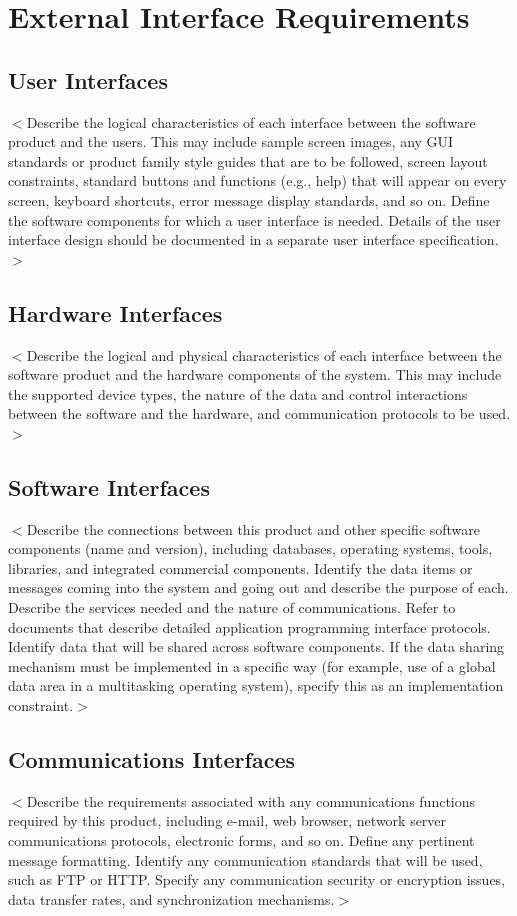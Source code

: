 \documentclass{scrreprt}
\begin{document}
\chapter{External Interface Requirements}

\section{User Interfaces}
$<$Describe the logical characteristics of each interface between the software
product and the users. This may include sample screen images, any GUI standards
or product family style guides that are to be followed, screen layout
constraints, standard buttons and functions (e.g., help) that will appear on
every screen, keyboard shortcuts, error message display standards, and so on.
Define the software components for which a user interface is needed. Details of
the user interface design should be documented in a separate user interface
specification.$>$

\section{Hardware Interfaces}
$<$Describe the logical and physical characteristics of each interface between
the software product and the hardware components of the system. This may include
the supported device types, the nature of the data and control interactions
between the software and the hardware, and communication protocols to be
used.$>$

\section{Software Interfaces}
$<$Describe the connections between this product and other specific software
components (name and version), including databases, operating systems, tools,
libraries, and integrated commercial components. Identify the data items or
messages coming into the system and going out and describe the purpose of each.
Describe the services needed and the nature of communications. Refer to
documents that describe detailed application programming interface protocols.
Identify data that will be shared across software components. If the data
sharing mechanism must be implemented in a specific way (for example, use of a
global data area in a multitasking operating system), specify this as an
implementation constraint.$>$

\section{Communications Interfaces}
$<$Describe the requirements associated with any communications functions
required by this product, including e-mail, web browser, network server
communications protocols, electronic forms, and so on. Define any pertinent
message formatting. Identify any communication standards that will be used, such
as FTP or HTTP. Specify any communication security or encryption issues, data
transfer rates, and synchronization mechanisms.$>$
\end{document}
